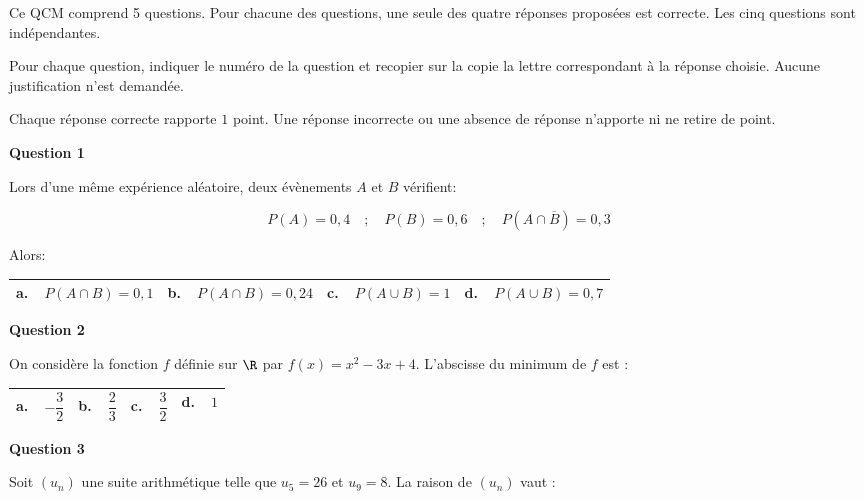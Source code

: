 \medskip

Ce QCM comprend 5 questions. Pour chacune des questions, une seule des quatre réponses proposées est correcte. Les cinq questions sont indépendantes.

Pour chaque question, indiquer le numéro de la question et recopier sur la copie la lettre correspondant à la réponse choisie. Aucune justification n'est demandée.

Chaque réponse correcte rapporte $1$ point. Une réponse incorrecte ou une absence de réponse n'apporte ni ne retire de point.

\medskip

\textbf{Question 1}

\medskip

Lors d'une même expérience aléatoire, deux évènements $A$ et $B$ vérifient:

\[P(A) = 0,4\quad ;\quad P(B) = 0,6\quad ;\quad  P\left( A \cap \overline{B}\right )= 0,3\]

Alors:

\begin{center}
\begin{tabularx}{\linewidth}{|*{4}{X|}}\hline
\textbf{a.~~}$P(A \cap B)= 0,1$&\textbf{b.~~}$P(A \cap B)= 0,24$&\textbf{c.~~}$P(A \cup B)=1$&\textbf{d.~~}$P(A \cup B)= 0,7$\\ \hline
\end{tabularx}
\end{center}

\medskip

\textbf{Question 2}

\medskip

On considère la fonction $f$ définie sur $\R$ par $f(x) = x^2 - 3x + 4$. L'abscisse du minimum de $f$ est :

\begin{center}
\begin{tabularx}{\linewidth}{|*{4}{X|}}\hline
\textbf{a.~~}$-\dfrac{3}{2}$&\textbf{b.~~}$\dfrac{2}{3}$&\textbf{c.~~}$\dfrac{3}{2}$&\textbf{d.~~}$1$\rule[-3mm]{0mm}{8mm}\\ \hline
\end{tabularx}
\end{center}

\medskip

\textbf{Question 3}

\medskip

Soit $\left(u_n\right)$ une suite arithmétique telle que $u_5 = 26$ et $u_9 = 8$. La raison de $\left(u_n\right)$ vaut :


